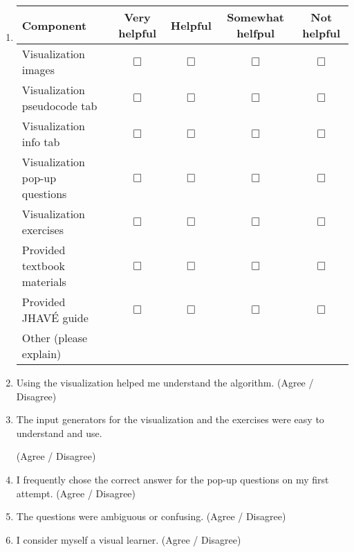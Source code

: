 \documentclass[letter]{article}
\begin{document}
\begin{enumerate}
\item
\begin{tabular}{| l | c | c | c | c |}
\hline
\textbf{Component} & \textbf{Very helpful} & \textbf{Helpful} & \textbf{Somewhat helfpul} & \textbf{Not helpful} \\
\hline
Visualization images & $\Box$ & $\Box$ & $\Box$ & $\Box$ \\
\hline
Visualization pseudocode tab & $\Box$ & $\Box$ & $\Box$ & $\Box$ \\
\hline
Visualization info tab & $\Box$ & $\Box$ & $\Box$ & $\Box$ \\
\hline
Visualization pop-up questions & $\Box$ & $\Box$ & $\Box$ & $\Box$ \\
\hline
Visualization exercises & $\Box$ & $\Box$ & $\Box$ & $\Box$ \\
\hline
Provided textbook materials & $\Box$ & $\Box$ & $\Box$ & $\Box$ \\
\hline
Provided JHAVÉ guide & $\Box$ & $\Box$ & $\Box$ & $\Box$ \\
\hline
Other (please explain) &&&&\\ %
\hline
\end{tabular}

\addtocounter{enumi}{7}%

\item Using the visualization helped me understand the algorithm.
(Agree / Disagree)

\item The input generators for the visualization and the exercises were easy to understand and use.

(Agree / Disagree)

\item I frequently chose the correct answer for the pop-up questions on my first attempt.
(Agree / Disagree)

\item The questions were ambiguous or confusing.
(Agree / Disagree)


\item I consider myself a visual learner.
(Agree / Disagree)



\end{enumerate}
\end{document}
